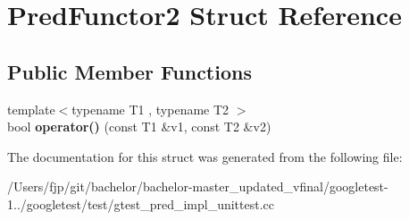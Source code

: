 \hypertarget{struct_pred_functor2}{}\section{Pred\+Functor2 Struct Reference}
\label{struct_pred_functor2}
\subsection*{Public Member Functions}
\begin{DoxyCompactItemize}
\item 
\mbox{\label{struct_pred_functor2_a2142c86e4c0a3139e167dd3f13eb7f6f}} 
{\footnotesize template$<$typename T1 , typename T2 $>$ }\\bool {\bfseries operator()} (const T1 \&v1, const T2 \&v2)
\end{DoxyCompactItemize}


The documentation for this struct was generated from the following file\+:\begin{DoxyCompactItemize}
\item 
/\+Users/fjp/git/bachelor/bachelor-\/master\+\_\+updated\+\_\+vfinal/googletest-\/1../googletest/test/gtest\+\_\+pred\+\_\+impl\+\_\+unittest.\+cc\end{DoxyCompactItemize}
